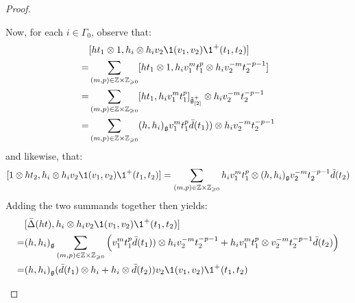 \begin{proof}
\begin{enumerate}
\begin{enumerate}
                            Now, for each $i \in \Gamma_0$, observe that:
                                $$
                                    \begin{aligned}
                                        & [h t_1 \tensor 1, h_i \tensor h_i v_2\1(v_1, v_2) \1^+(t_1, t_2)]
                                        \\
                                        = & \sum_{(m, p) \in \Z \x \Z_{\geq 0}} [ht_1 \tensor 1, h_i v_1^m t_1^p \tensor h_i v_2^{-m} t_2^{-p - 1}]
                                        \\
                                        = & \sum_{(m, p) \in \Z \x \Z_{\geq 0}} [ht_1, h_i v_1^m t_1^p]_{\tilde{\g}_{[2]}^+} \tensor h_i v_2^{-m} t_2^{-p - 1}
                                        \\
                                        = & \sum_{(m, p) \in \Z \x \Z_{\geq 0}} (h, h_i)_{\g} v_1^m t_1^p \bar{d}(t_1)) \tensor h_i v_2^{-m} t_2^{-p - 1}
                                    \end{aligned}
                                $$
                            and likewise, that:
                                $$[1 \tensor h t_2, h_i \tensor h_i v_2\1(v_1, v_2) \1^+(t_1, t_2)] = \sum_{(m, p) \in \Z \x \Z_{\geq 0}} h_i v_1^m t_1^p \tensor (h, h_i)_{\g} v_2^{-m} t_2^{-p - 1} \bar{d}(t_2)$$
                            Adding the two summands together then yields:
                                $$
                                    \begin{aligned}
                                        & [\bar{\Delta}(ht), h_i \tensor h_i v_2\1(v_1, v_2) \1^+(t_1, t_2)]
                                        \\
                                        = & (h, h_i)_{\g} \sum_{(m, p) \in \Z \x \Z_{\geq 0}} \left( v_1^m t_1^p \bar{d}(t_1)) \tensor h_i v_2^{-m} t_2^{-p - 1} + h_i v_1^m t_1^p \tensor v_2^{-m} t_2^{-p - 1} \bar{d}(t_2) \right)
                                        \\
                                        = & (h, h_i)_{\g} ( \bar{d}(t_1) \tensor h_i + h_i \tensor \bar{d}(t_2) ) v_2\1(v_1, v_2) \1^+(t_1, t_2)
                                    \end{aligned}
                                $$
                            

\end{enumerate}
\end{enumerate}
\end{proof}
